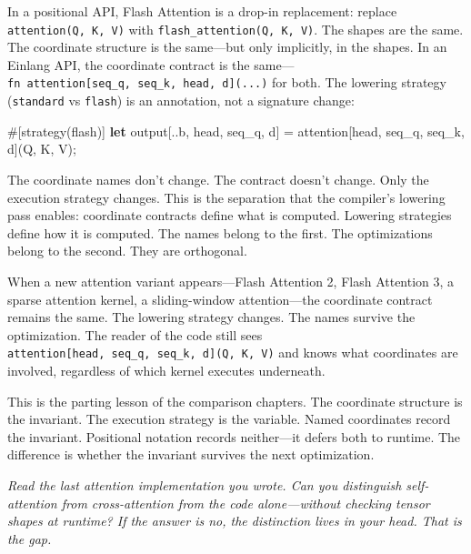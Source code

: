 \documentclass[11pt,titlepage]{article}
\newenvironment{Shaded}{}{}
\newcommand{\AttributeTok}[1]{\textcolor[rgb]{0.49,0.56,0.16}{#1}}
\newcommand{\KeywordTok}[1]{\textcolor[rgb]{0.00,0.44,0.13}{\textbf{#1}}}
\newcommand{\NormalTok}[1]{#1}
\newcommand{\OperatorTok}[1]{\textcolor[rgb]{0.40,0.40,0.40}{#1}}
\begin{document}
In a positional API, Flash Attention is a drop-in replacement: replace
\texttt{attention(Q,\ K,\ V)} with \texttt{flash\_attention(Q,\ K,\ V)}.
The shapes are the same. The coordinate structure is the same---but only
implicitly, in the shapes. In an Einlang API, the coordinate contract is
the same---\texttt{fn\ attention{[}seq\_q,\ seq\_k,\ head,\ d{]}(...)}
for both. The lowering strategy (\texttt{standard} vs \texttt{flash}) is
an annotation, not a signature change:

\begin{Shaded}
\begin{Highlighting}[]
\AttributeTok{#[}\NormalTok{strategy}\AttributeTok{(}\NormalTok{flash}\AttributeTok{)]}
\KeywordTok{let}\NormalTok{ output}\OperatorTok{[}\NormalTok{..b, head, seq_q, d}\OperatorTok{]}\NormalTok{ = attention}\OperatorTok{[}\NormalTok{head, seq_q, seq_k, d}\OperatorTok{]}\NormalTok{(Q, K, V);}
\end{Highlighting}
\end{Shaded}

The coordinate names don't change. The contract doesn't change. Only the
execution strategy changes. This is the separation that the compiler's
lowering pass enables: coordinate contracts define what is computed.
Lowering strategies define how it is computed. The names belong to the
first. The optimizations belong to the second. They are orthogonal.

When a new attention variant appears---Flash Attention 2, Flash
Attention 3, a sparse attention kernel, a sliding-window attention---the
coordinate contract remains the same. The lowering strategy changes. The
names survive the optimization. The reader of the code still sees
\texttt{attention{[}head,\ seq\_q,\ seq\_k,\ d{]}(Q,\ K,\ V)} and knows
what coordinates are involved, regardless of which kernel executes
underneath.

This is the parting lesson of the comparison chapters. The coordinate
structure is the invariant. The execution strategy is the variable.
Named coordinates record the invariant. Positional notation records
neither---it defers both to runtime. The difference is whether the
invariant survives the next optimization.

\vspace{2em}

\emph{Read the last attention implementation you wrote. Can you
distinguish self-attention from cross-attention from the code
alone---without checking tensor shapes at runtime? If the answer is no,
the distinction lives in your head. That is the gap.}
\end{document}
